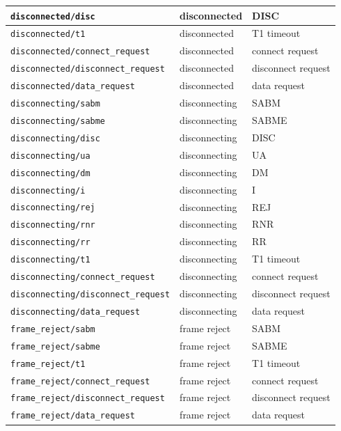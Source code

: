 \documentclass[a4paper]{article}
\begin{document}
{\begin{center}
\begin{tabular}[h]{|l|l|l|}
  \hline
\verb'disconnected/disc' & disconnected & DISC\\
  \hline
\verb'disconnected/t1' & disconnected & T1 timeout\\
  \hline
\verb'disconnected/connect_request' & disconnected & connect request\\
  \hline
\verb'disconnected/disconnect_request' & disconnected & disconnect request\\
  \hline
\verb'disconnected/data_request' & disconnected & data request\\
  \hline
\verb'disconnecting/sabm' & disconnecting & SABM\\
  \hline
\verb'disconnecting/sabme' & disconnecting & SABME\\
  \hline
\verb'disconnecting/disc' & disconnecting & DISC\\
  \hline
\verb'disconnecting/ua' & disconnecting & UA\\
  \hline
\verb'disconnecting/dm' & disconnecting & DM\\
  \hline
\verb'disconnecting/i' & disconnecting & I\\
  \hline
\verb'disconnecting/rej' & disconnecting & REJ\\
  \hline
\verb'disconnecting/rnr' & disconnecting & RNR\\
  \hline
\verb'disconnecting/rr' & disconnecting & RR\\
  \hline
\verb'disconnecting/t1' & disconnecting & T1 timeout\\
  \hline
\verb'disconnecting/connect_request' & disconnecting & connect request\\
  \hline
\verb'disconnecting/disconnect_request' & disconnecting & disconnect request\\
  \hline
\verb'disconnecting/data_request' & disconnecting & data request\\
  \hline
\verb'frame_reject/sabm' & frame reject & SABM\\
  \hline
\verb'frame_reject/sabme' & frame reject & SABME\\
  \hline
\verb'frame_reject/t1' & frame reject & T1 timeout\\
  \hline
\verb'frame_reject/connect_request' & frame reject & connect request\\
  \hline
\verb'frame_reject/disconnect_request' & frame reject & disconnect request\\
  \hline
\verb'frame_reject/data_request'  & frame reject & data request\\
  \hline
\end{tabular}
\end{center}
}
\end{document}

